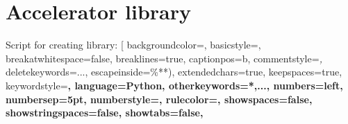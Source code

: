 \chapter{Accelerator library}




Script for creating library:
[  backgroundcolor=\color{white},   %
  basicstyle=\footnotesize,        %
  breakatwhitespace=false,         %
  breaklines=true,                 %
  captionpos=b,                    %
  commentstyle=\color{commentsColor}\textit,    %
  deletekeywords={...},            %
  escapeinside={\%*}{*)},          %
  extendedchars=true,              %
  keepspaces=true,                 %
  keywordstyle=\color{keywordsColor}\bfseries,       %
  language=Python,                 %
  otherkeywords={*,...},           %
  numbers=left,                    %
  numbersep=5pt,                   %
  numberstyle=\tiny\color{commentsColor}, %
  rulecolor=\color{black},         %
  showspaces=false,                %
  showstringspaces=false,          %
  showtabs=false,                  %
